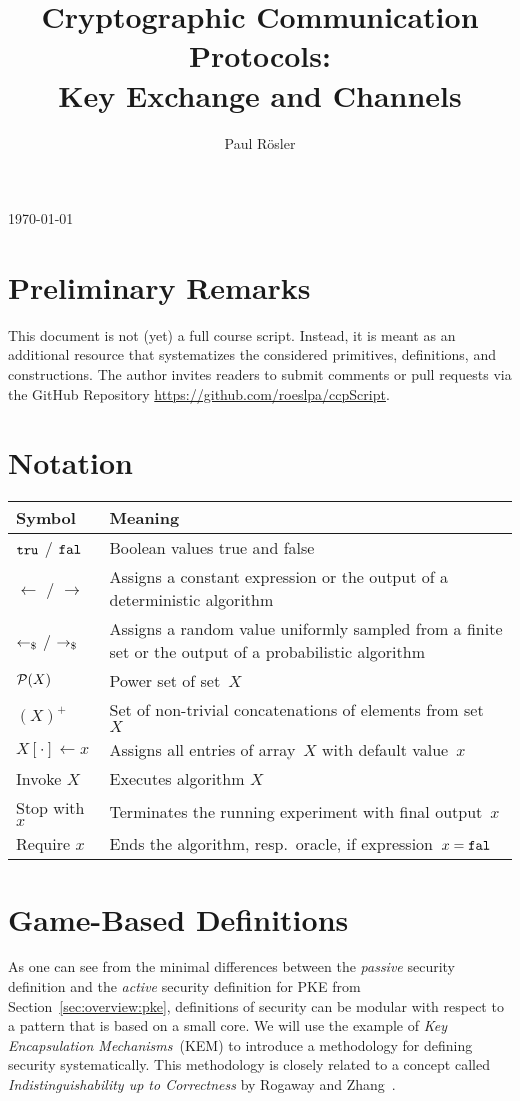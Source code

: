 \documentclass[a4paper,orivec]{llncs}
\title{Cryptographic Communication Protocols:\\Key Exchange and Channels}
\author{Paul Rösler}
\institute{FAU Erlangen-Nürnberg}
\begin{document}
\maketitle
\begin{center}
    \today
\end{center}

\begingroup
\let\clearpage\relax
\tableofcontents
\endgroup

\section{Preliminary Remarks}
This document is not (yet) a full course script.
Instead, it is meant as an additional resource that systematizes the considered primitives, definitions, and constructions.
The author invites readers to submit comments or pull requests via the GitHub Repository \url{https://github.com/roeslpa/ccpScript}.


\section{Notation}

\begin{tabular}{|l|p{13cm}|}\hline
    \textbf{Symbol} & \textbf{Meaning}\\\hline
    $\mathtt{tru}$ / $\mathtt{fal}$ & Boolean values true and false\\
    $\gets$ / $\to$ & Assigns a constant expression or the output of a deterministic algorithm\\
    $\getsr$ / $\tor$ & Assigns a random value uniformly sampled from a finite set or the output of a probabilistic algorithm\\
    $\mathcal{P}(X)$ & Power set of set~$X$\\
    $(X)^+$ & Set of non-trivial concatenations of elements from set~$X$\\
    $X[\cdot]\gets x$ & Assigns all entries of array~$X$ with default value~$x$\\
    Invoke $X$ & Executes algorithm $X$\\
    Stop with $x$ & Terminates the running experiment with final output~$x$\\
    Require $x$ & Ends the algorithm, resp.~oracle, if expression~$x=\mathtt{fal}$\\\hline
\end{tabular}





\section{Game-Based Definitions}
As one can see from the minimal differences between the \emph{passive} security definition and the \emph{active} security definition for PKE from Section~\ref{sec:overview:pke}, definitions of security can be modular with respect to a pattern that is based on a small core.
We will use the example of \emph{Key Encapsulation Mechanisms}~(KEM) to introduce a methodology for defining security systematically.
This methodology is closely related to a concept called \emph{Indistinguishability up to Correctness} by Rogaway and Zhang~\cite{C:RogZha18}.
\end{document}
